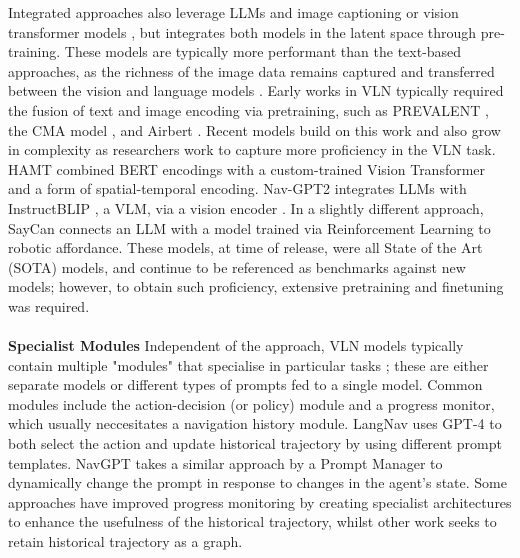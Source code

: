\documentclass{svproc}
\begin{document}
    \par Integrated approaches also leverage LLMs and image captioning or vision transformer models \cite{dosovitskiy2021imageworth16x16words}, but integrates both models in the latent space through pre-training. These models are typically more performant than the text-based approaches, as the richness of the image data remains captured and transferred between the vision and language models \cite{pan2024langnavlanguageperceptualrepresentation}. Early works in VLN typically required the fusion of text and image encoding via pretraining, such as PREVALENT \cite{9156554}, the CMA model \cite{krantz2020navgraphvisionandlanguagenavigationcontinuous}, and Airbert \cite{Guhur_2021_ICCV}. Recent models build on this work and also grow in complexity as researchers work to capture more proficiency in the VLN task. HAMT \cite{chen2021_HAMT} combined BERT \cite{devlin-etal-2019-bert} encodings with a custom-trained Vision Transformer \cite{dosovitskiy2021imageworth16x16words} and a form of spatial-temporal encoding.  Nav-GPT2 \cite{navgpt2} integrates LLMs with InstructBLIP \cite{dai2023instructblipgeneralpurposevisionlanguagemodels}, a VLM, via a vision encoder \cite{10203681}. In a slightly different approach, SayCan \cite{51647} connects an LLM with a model trained via Reinforcement Learning to robotic affordance. These models, at time of release, were all State of the Art (SOTA) models, and continue to be referenced as benchmarks against new models; however, to obtain such proficiency, extensive pretraining and finetuning was required.
    \\ \\
    \textbf{Specialist Modules}  Independent of the approach, VLN models typically contain multiple "modules" that specialise in particular tasks \cite{wu2022visionlanguagenavigationsurveytaxonomy}; these are either separate models or different types of prompts fed to a single model. Common modules include the action-decision (or policy) module and a progress monitor, which usually neccesitates a navigation history module. LangNav \cite{pan2024langnavlanguageperceptualrepresentation} uses GPT-4 to both select the action and update historical trajectory by using different prompt templates. NavGPT \cite{zhou2023navgptexplicitreasoningvisionandlanguage} takes a similar approach by a Prompt Manager to dynamically change the prompt in response to changes in the agent's state. Some approaches \cite{chen2021_HAMT, HE2024110511_MemoryAdaptiveVLN} have improved progress monitoring by creating specialist architectures to enhance the usefulness of the historical trajectory, whilst other work \cite{9879544, chen-etal-2024-mapgpt} seeks to retain historical trajectory as a graph.
\end{document}
